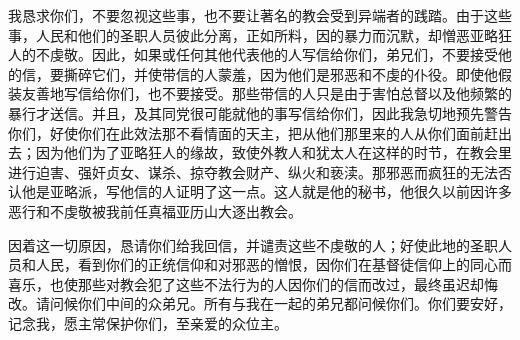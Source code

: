 我恳求你们，不要忽视这些事，也不要让著名的教会受到异端者的践踏。由于这些事，人民和他们的圣职人员彼此分离，正如所料，因的暴力而沉默，却憎恶亚略狂人的不虔敬。因此，如果或任何其他代表他的人写信给你们，弟兄们，不要接受他的信，要撕碎它们，并使带信的人蒙羞，因为他们是邪恶和不虔的仆役。即使他假装友善地写信给你们，也不要接受。那些带信的人只是由于害怕总督以及他频繁的暴行才送信。并且，及其同党很可能就他的事写信给你们，因此我急切地预先警告你们，好使你们在此效法那不看情面的天主，把从他们那里来的人从你们面前赶出去；因为他们为了亚略狂人的缘故，致使外教人和犹太人在这样的时节，在教会里进行迫害、强奸贞女、谋杀、掠夺教会财产、纵火和亵渎。那邪恶而疯狂的无法否认他是亚略派，写他信的人证明了这一点。这人就是他的秘书，他很久以前因许多恶行和不虔敬被我前任真福亚历山大逐出教会。\par

因着这一切原因，恳请你们给我回信，并谴责这些不虔敬的人；好使此地的圣职人员和人民，看到你们的正统信仰和对邪恶的憎恨，因你们在基督徒信仰上的同心而喜乐，也使那些对教会犯了这些不法行为的人因你们的信而改过，最终虽迟却悔改。请问候你们中间的众弟兄。所有与我在一起的弟兄都问候你们。你们要安好，记念我，愿主常保护你们，至亲爱的众位主。\par

